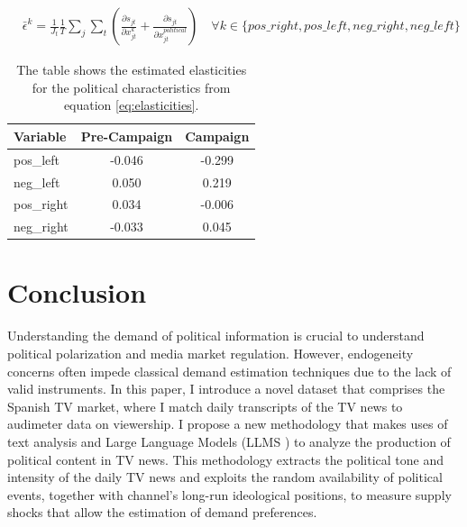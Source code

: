 \documentclass[12pt]{article}
\begin{document}
	\begin{equation}\label{eq:elasticities}
		\begin{aligned}
			& \bar{\epsilon}^k= \frac{1}{J_t}\frac{1}{T}\sum_{j}\sum_{t} \left(\frac{\partial s_{jt}}{\partial x_{jt}^k} +  \frac{\partial s_{jt}}{\partial x_{jt}^{political}} \right)\quad \forall k \in \{pos\_right,pos\_left,neg\_right,neg\_left\}
		\end{aligned}
	\end{equation}             
	
	
	
	
	\begin{table}[H]
		\centering
		\begin{tabular}{|l|c|c|}
			\hline
			\textbf{Variable} & \textbf{Pre-Campaign} & \textbf{Campaign} \\
			\hline
			pos\_left & -0.046 & -0.299 \\
			neg\_left & 0.050 & 0.219 \\
			pos\_right & 0.034 & -0.006 \\
			neg\_right & -0.033 & 0.045 \\
			\hline
		\end{tabular}
		\caption{The table shows the estimated elasticities for the political characteristics from equation \ref{eq:elasticities}.}
		\label{tab:elasticities_comparison}
	\end{table}
	
	
	
	

	
	\section{Conclusion}
	
	Understanding the demand of political information is crucial to understand political polarization and media market regulation. However, endogeneity concerns often  impede classical demand estimation techniques due to the lack of valid instruments. In this paper,  I introduce a novel dataset that comprises the Spanish TV market, where I match daily transcripts of the TV news to audimeter data on viewership. I propose a new methodology that makes uses of text analysis and Large Language Models (LLMS ) to analyze the production of political content in TV news. This methodology extracts the political tone and intensity of the daily TV news and  exploits the random availability of political events, together with channel's long-run ideological positions, to measure supply shocks that allow the estimation of  demand preferences.
	
\end{document}
